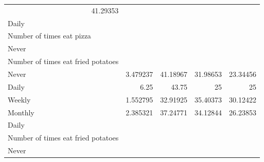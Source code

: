 \documentclass{article}
\begin{document}
\begin{table}[!h]
{\begin{tabular}{lllll}
			\multicolumn{1}{r}{41.29353} \\
			\multicolumn{1}{l}{\hspace{1em}Daily} &
			\multicolumn{1}{|r}{} &
			\multicolumn{1}{r}{} &
			\multicolumn{1}{r}{} &
			\multicolumn{1}{r}{} \\
			\multicolumn{1}{l}{\hspace{2em}Number of times eat pizza} &
			\multicolumn{1}{|r}{} &
			\multicolumn{1}{r}{} &
			\multicolumn{1}{r}{} &
			\multicolumn{1}{r}{} \\
			\multicolumn{1}{l}{\hspace{3em}Never} &
			\multicolumn{1}{|r}{} &
			\multicolumn{1}{r}{} &
			\multicolumn{1}{r}{} &
			\multicolumn{1}{r}{} \\
			\multicolumn{1}{l}{\hspace{4em}Number of times eat fried potatoes} &
			\multicolumn{1}{|r}{} &
			\multicolumn{1}{r}{} &
			\multicolumn{1}{r}{} &
			\multicolumn{1}{r}{} \\
			\multicolumn{1}{l}{\hspace{5em}Never} &
			\multicolumn{1}{|r}{3.479237} &
			\multicolumn{1}{r}{41.18967} &
			\multicolumn{1}{r}{31.98653} &
			\multicolumn{1}{r}{23.34456} \\
			\multicolumn{1}{l}{\hspace{5em}Daily} &
			\multicolumn{1}{|r}{6.25} &
			\multicolumn{1}{r}{43.75} &
			\multicolumn{1}{r}{25} &
			\multicolumn{1}{r}{25} \\
			\multicolumn{1}{l}{\hspace{5em}Weekly} &
			\multicolumn{1}{|r}{1.552795} &
			\multicolumn{1}{r}{32.91925} &
			\multicolumn{1}{r}{35.40373} &
			\multicolumn{1}{r}{30.12422} \\
			\multicolumn{1}{l}{\hspace{5em}Monthly} &
			\multicolumn{1}{|r}{2.385321} &
			\multicolumn{1}{r}{37.24771} &
			\multicolumn{1}{r}{34.12844} &
			\multicolumn{1}{r}{26.23853} \\
			\multicolumn{1}{l}{\hspace{3em}Daily} &
			\multicolumn{1}{|r}{} &
			\multicolumn{1}{r}{} &
			\multicolumn{1}{r}{} &
			\multicolumn{1}{r}{} \\
			\multicolumn{1}{l}{\hspace{4em}Number of times eat fried potatoes} &
			\multicolumn{1}{|r}{} &
			\multicolumn{1}{r}{} &
			\multicolumn{1}{r}{} &
			\multicolumn{1}{r}{} \\
			\multicolumn{1}{l}{\hspace{5em}Never} &

\end{tabular}}
\end{table}
\end{document}
